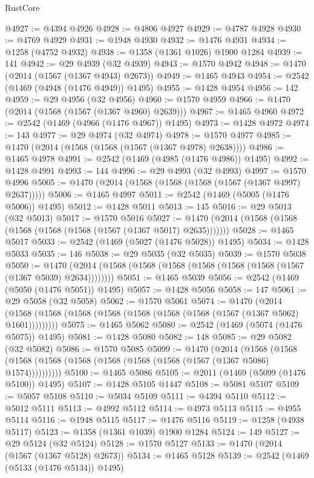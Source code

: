 \begin{lexlean}{RustCore}
\begin{coremodule}
{\begin{coremodule}
{{{{{{{{{{{{{{{{{{{{{{{{{{{{{{{{{{{{{{{{{{{{{{{@4927 := @4394 @4926
@4928 := @4806 @4927
@4929 := @4787 @4928
@4930 := @4769 @4929
@4931 := @1948 @4930
@4932 := @1476 @4931
@4934 := @1258 (@4752 @4932)
@4938 := @1358 (@1361 @1026) @1900 @1284
@4939 := 141
@4942 := @29 @4939 (@32 @4939)
@4943 := @1570 @4942
@4948 := @1470 (@2014 (@1567 (@1367 @4943) @2673))
@4949 := @1465 @4943
@4954 := @2542 (@1469 (@4948 (@1476 @4949)) @1495)
@4955 := @1428 @4954
@4956 := 142
@4959 := @29 @4956 (@32 @4956)
@4960 := @1570 @4959
@4966 := @1470 (@2014 (@1568 (@1567 (@1367 @4960) @2639)))
@4967 := @1465 @4960
@4972 := @2542 (@1469 (@4966 (@1476 @4967)) @1495)
@4973 := @1428 @4972
@4974 := 143
@4977 := @29 @4974 (@32 @4974)
@4978 := @1570 @4977
@4985 := @1470 (@2014 (@1568 (@1568 (@1567 (@1367 @4978) @2638))))
@4986 := @1465 @4978
@4991 := @2542 (@1469 (@4985 (@1476 @4986)) @1495)
@4992 := @1428 @4991
@4993 := 144
@4996 := @29 @4993 (@32 @4993)
@4997 := @1570 @4996
@5005 := @1470 (@2014 (@1568 (@1568 (@1568 (@1567 (@1367 @4997) @2637)))))
@5006 := @1465 @4997
@5011 := @2542 (@1469 (@5005 (@1476 @5006)) @1495)
@5012 := @1428 @5011
@5013 := 145
@5016 := @29 @5013 (@32 @5013)
@5017 := @1570 @5016
@5027 := @1470 (@2014 (@1568 (@1568 (@1568 (@1568 (@1568 (@1567 (@1367 @5017) @2635)))))))
@5028 := @1465 @5017
@5033 := @2542 (@1469 (@5027 (@1476 @5028)) @1495)
@5034 := @1428 @5033
@5035 := 146
@5038 := @29 @5035 (@32 @5035)
@5039 := @1570 @5038
@5050 := @1470 (@2014 (@1568 (@1568 (@1568 (@1568 (@1568 (@1568 (@1567 (@1367 @5039) @2634))))))))
@5051 := @1465 @5039
@5056 := @2542 (@1469 (@5050 (@1476 @5051)) @1495)
@5057 := @1428 @5056
@5058 := 147
@5061 := @29 @5058 (@32 @5058)
@5062 := @1570 @5061
@5074 := @1470
    (@2014 (@1568 (@1568 (@1568 (@1568 (@1568 (@1568 (@1568 (@1567 (@1367 @5062) @1601)))))))))
@5075 := @1465 @5062
@5080 := @2542 (@1469 (@5074 (@1476 @5075)) @1495)
@5081 := @1428 @5080
@5082 := 148
@5085 := @29 @5082 (@32 @5082)
@5086 := @1570 @5085
@5099 := @1470
    (@2014
      (@1568 (@1568 (@1568 (@1568 (@1568 (@1568 (@1568 (@1568 (@1567 (@1367 @5086) @1574))))))))))
@5100 := @1465 @5086
@5105 := @2011 (@1469 (@5099 (@1476 @5100)) @1495)
@5107 := @1428 @5105 @1447
@5108 := @5081 @5107
@5109 := @5057 @5108
@5110 := @5034 @5109
@5111 := @4394 @5110
@5112 := @5012 @5111
@5113 := @4992 @5112
@5114 := @4973 @5113
@5115 := @4955 @5114
@5116 := @1948 @5115
@5117 := @1476 @5116
@5119 := @1258 (@4938 @5117)
@5123 := @1358 (@1361 @1039) @1900 @1284
@5124 := 149
@5127 := @29 @5124 (@32 @5124)
@5128 := @1570 @5127
@5133 := @1470 (@2014 (@1567 (@1367 @5128) @2673))
@5134 := @1465 @5128
@5139 := @2542 (@1469 (@5133 (@1476 @5134)) @1495)
}}}}}}}}}}}}}}}}}}}}}}}}}}}}}}}}}}}}}}}}}}}}}}}
\end{coremodule}}
\end{coremodule}
\end{lexlean}
